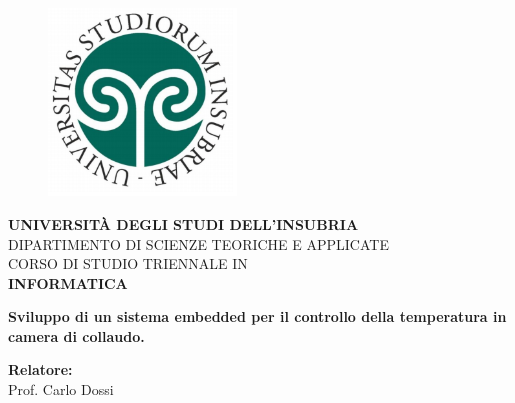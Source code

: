 \begin{titlepage}
\begin{figure}[!htb]
    \centering
    \includegraphics[width=5cm]{Immagini/uninsubria-logo.png}
\end{figure}

\begin{center}
    \Large{\textbf{UNIVERSITÀ DEGLI STUDI DELL'INSUBRIA}}
    \vspace{3mm}
    \\ \normalsize{DIPARTIMENTO DI SCIENZE TEORICHE E APPLICATE}
    \vspace{6mm}
    \\ \normalsize{CORSO  DI STUDIO TRIENNALE  IN}
    \\  \normalsize{\textbf{INFORMATICA}}
    \vspace{13mm}
\end{center}

\vspace{10mm}
\begin{center}
    \LARGE{\textbf{Sviluppo di un sistema embedded per il controllo della temperatura in camera di collaudo.}}
\end{center}

\vspace*{\fill}

\begin{minipage}[t]{1\textwidth}
    \begin{multicols}{2}
    	{\normalsize{\textbf{Relatore:}}{\normalsize\vspace{1mm}
        \\ \normalsize{Prof. Carlo Dossi }}} \\ 

        

\end{multicols}
\end{minipage}
\end{titlepage}

